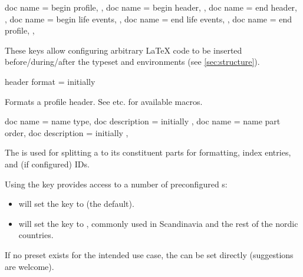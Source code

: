 \documentclass[
	a4paper,
]{article}
\begin{document}
\begin{docKeys}
	[
		doc parameter = {=\meta{...}},
		doc description = {initially not set},
	]
	{
		{
			doc name = begin profile,
		},
		{
			doc name = begin header,
		},
		{
			doc name = end header,
		},
		{
			doc name = begin life events,
		},
		{
			doc name = end life events,
		},
		{
			doc name = end profile,
		},
	}

	These keys allow configuring arbitrary \LaTeX{} code to be inserted before/during/after the typeset  and  environments (see \cref{sec:structure}).

\end{docKeys}

\begin{docKey}
	{header format}
	{=}
	{initially }

	Formats a profile header. See  etc. for available macros.
\end{docKey}

\begin{docKeys}
	[
		doc parameter = {=\meta{...}},
	]
	{
		{
			doc name = name type,
			doc description = {initially }
		},
		{
			doc name = name part order,
			doc description = {initially }
		},
	}

	The  is used for splitting a  to its constituent parts for formatting, index entries, and (if configured) IDs.

	Using the  key provides access to a number of preconfigured s:

	\begin{itemize}
		\item {} will set the  key to  (the default).
		\item {} will set the  key to , commonly used in Scandinavia and the rest of the nordic countries.
	\end{itemize}

	If no preset  exists for the intended use case, the  can be set directly (suggestions are welcome).
\end{docKeys}
\end{document}
